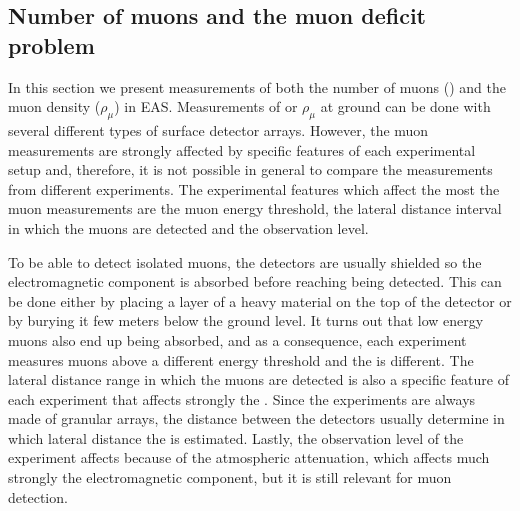 \subsection{Number of muons and the muon deficit problem}
\label{sec:shower:observables:nmu}

In this section we present measurements of both the number of muons (\nmu)
and the muon density ($\rho_\mu$) in EAS.
Measurements of \nmu or $\rho_\mu$ at ground can
be done with several different types of surface detector arrays.
However, the muon measurements are strongly affected by specific features
of each experimental setup and, therefore, it is not possible in general
to compare the measurements from different experiments. The experimental features
which affect the most the muon measurements are the muon energy threshold,
the lateral distance interval in which the muons are detected and the observation
level. 

To be able to detect isolated muons, the detectors are usually shielded so the
electromagnetic component is absorbed before reaching being detected. This can
be done either by placing a layer of a heavy material on the top of the detector
or by burying it few meters below the ground level. It turns out that low energy muons
also end up being absorbed, and as a consequence, each experiment measures
muons above a different energy threshold and the \nmu is different.
The lateral distance range in which the muons are detected is also
a specific feature of each experiment that affects strongly the \nmu. Since
the experiments are always made of granular arrays, the distance between the detectors
usually determine in which lateral distance the \nmu is estimated. Lastly,
the observation level of the experiment affects \nmu because of the atmospheric attenuation,
which affects much strongly the electromagnetic component, but it is still relevant for
muon detection.

